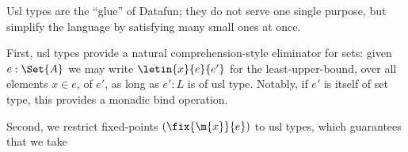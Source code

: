 \documentclass[preprint]{sigplanconf}
\begin{document}
\begin{enumerate}
  Usl types are the ``glue'' of Datafun; they do not serve one single purpose,
  but simplify the language by satisfying many small ones at once.

  First, usl types provide a natural comprehension-style eliminator for sets:
  given $e : \Set{A}$ we may write $\letin{x}{e}{e'}$ for the least-upper-bound,
  over all elements $x \in e$, of $e'$, as long as $e' : L$ is of usl type.
  Notably, if $e'$ is itself of set type, this provides a monadic bind
  operation. 

  Second, we restrict fixed-points $(\fix{\m{x}}{e})$ to usl types, which
  guarantees that we take



\end{enumerate}
\end{document}
